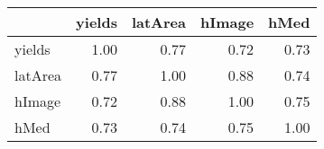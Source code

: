 \begin{tabular}{lrrrr}
\toprule
{} &  yields &  latArea &  hImage &  hMed \\
\midrule
yields  &    1.00 &     0.77 &    0.72 &  0.73 \\
latArea &    0.77 &     1.00 &    0.88 &  0.74 \\
hImage  &    0.72 &     0.88 &    1.00 &  0.75 \\
hMed    &    0.73 &     0.74 &    0.75 &  1.00 \\
\bottomrule
\end{tabular}
